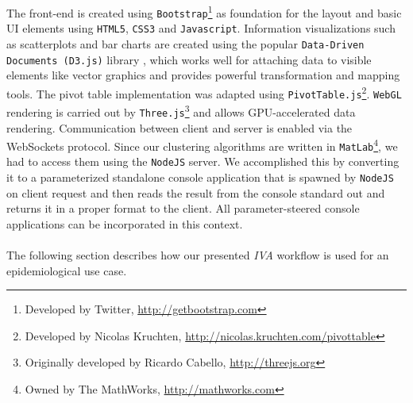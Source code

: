 \documentclass[journal]{style/vgtc} 			          %
\begin{document}
The front-end is created using \texttt{Bootstrap}\footnote{Developed by Twitter, \url{http://getbootstrap.com}} as foundation for the layout and basic UI elements using \texttt{HTML5}, \texttt{CSS3} and \texttt{Javascript}.
%
Information visualizations such as scatterplots and bar charts are created using the popular \texttt{Data-Driven Documents (D3.js)} library \cite{D3}, which works well for attaching data to visible elements like vector graphics and provides powerful transformation and mapping tools.
%
The pivot table implementation was adapted using \texttt{PivotTable.js}\footnote{Developed by Nicolas Kruchten, \url{http://nicolas.kruchten.com/pivottable}}.
%
\texttt{WebGL} rendering is carried out by \texttt{Three.js}\footnote{Originally developed by Ricardo Cabello, \url{http://threejs.org}} and allows GPU-accelerated data rendering.
%
Communication between client and server is enabled via the WebSockets protocol.
%
Since our clustering algorithms are written in \texttt{MatLab}\footnote{Owned by The MathWorks, \url{http://mathworks.com}}, we had to access them using the \texttt{NodeJS} server.
%
We accomplished this by converting it to a parameterized standalone console application that is spawned by \texttt{NodeJS} on client request and then reads the result from the console standard out and returns it in a proper format to the client.
%
All parameter-steered console applications can be incorporated in this context.
\\\\
The following section describes how our presented \emph{IVA} workflow is used for an epidemiological use case.
\end{document}
